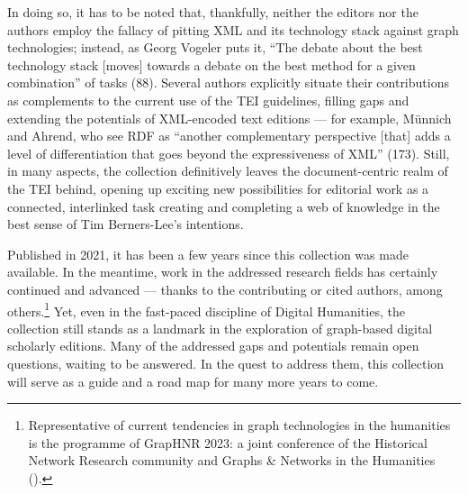 \begin{review}
In doing so, it has to be noted that, thankfully, neither the editors
nor the authors employ the fallacy of pitting XML and its technology
stack against graph technologies; instead, as Georg Vogeler puts it,
``The debate about the best technology stack {[}moves{]} towards a
debate on the best method for a given combination'' of tasks (88).
Several authors explicitly situate their contributions as complements to
the current use of the TEI guidelines, filling gaps and extending the
potentials of XML-encoded text editions --- for example, Münnich and
Ahrend, who see RDF as ``another complementary perspective {[}that{]}
adds a level of differentiation that goes beyond the expressiveness of
XML'' (173). Still, in many aspects, the collection definitively leaves
the document-centric realm of the TEI behind, opening up exciting new
possibilities for editorial work as a connected, interlinked task
creating and completing a web of knowledge in the best sense of Tim
Berners-Lee's intentions.

Published in 2021, it has been a few years since this collection was
made available. In the meantime, work in the addressed research fields
has certainly continued and advanced --- thanks to the contributing or
cited authors, among others.\footnote{Representative of current
  tendencies in graph technologies in the humanities is the programme of
  GrapHNR 2023: a joint conference of the Historical Network Research
  community and Graphs \& Networks in the Humanities (\citeyear{historical_network_research_and_graphs__networks_in_the_humanities_graphnr_2023}).} Yet, even in the fast-paced discipline
of Digital Humanities, the collection still stands as a landmark in the
exploration of graph-based digital scholarly editions. Many of the
addressed gaps and potentials remain open questions, waiting to be
answered. In the quest to address them, this collection will serve as a
guide and a road map for many more years to come.

\vspace{4em}

\begin{flushleft}
    \renewcommand*{\mkbibnamefamily}[1]{\textsc{#1}}
    \renewcommand*{\mkbibnamegiven}[1]{\textsc{#1}} 
\printbibliography
\end{flushleft}

\end{review}